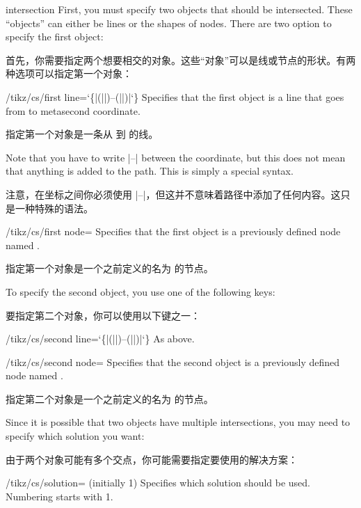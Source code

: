 \begin{coordinatesystem}{intersection}
  First, you must specify two objects that should be
  intersected. These ``objects'' can either be lines or the shapes of
  nodes. There are two option to specify the first object:

  首先，你需要指定两个想要相交的对象。这些“对象”可以是线或节点的形状。有两种选项可以指定第一个对象：

  \begin{key}{/tikz/cs/first line={\ttfamily\char`\{}|(||)--(||)|{\ttfamily\char`\}}}
    Specifies that the first object is a line that goes from
     to meta{second coordinate}.

    指定第一个对象是一条从  到  的线。
  \end{key}
  Note that you have to write |--| between the coordinate, but this
  does not mean that anything is added to the path. This is simply a
  special syntax.

  注意，在坐标之间你必须使用 |--|，但这并不意味着路径中添加了任何内容。这只是一种特殊的语法。
  \begin{key}{/tikz/cs/first node=}
    Specifies that the first object is a previously defined node named
    .

    指定第一个对象是一个之前定义的名为  的节点。

  \end{key}

  To specify the second object, you use one of the following keys:

  要指定第二个对象，你可以使用以下键之一：
  \begin{key}{/tikz/cs/second line={\ttfamily\char`\{}|(||)--(||)|{\ttfamily\char`\}}}
    As above.
  \end{key}
  \begin{key}{/tikz/cs/second node=}
    Specifies that the second object is a previously defined node
    named .

    指定第二个对象是一个之前定义的名为  的节点。
  \end{key}

  Since it is possible that two objects have multiple intersections,
  you may need to specify which solution you want:

  由于两个对象可能有多个交点，你可能需要指定要使用的解决方案：
  \begin{key}{/tikz/cs/solution= (initially 1)}
    Specifies which solution should be used. Numbering starts with 1.


\end{key}
\end{coordinatesystem}
